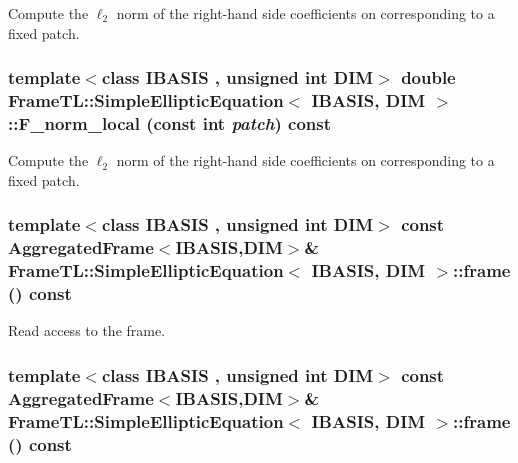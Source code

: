 Compute the $\ell_2$ norm of the right-hand side coefficients on corresponding to a fixed patch. \hypertarget{classFrameTL_1_1SimpleEllipticEquation_dc2e6668d1d7f143d1ce1a88e18eddc8}{
\subsubsection[{F\_\-norm\_\-local}]{\setlength{\rightskip}{0pt plus 5cm}template$<$class IBASIS , unsigned int DIM$>$ double {\bf FrameTL::SimpleEllipticEquation}$<$ IBASIS, DIM $>$::F\_\-norm\_\-local (const int {\em patch}) const}}
\label{classFrameTL_1_1SimpleEllipticEquation_dc2e6668d1d7f143d1ce1a88e18eddc8}


Compute the $\ell_2$ norm of the right-hand side coefficients on corresponding to a fixed patch. \hypertarget{classFrameTL_1_1SimpleEllipticEquation_21d88cf95981a8f5c3187c7339491b41}{
\subsubsection[{frame}]{\setlength{\rightskip}{0pt plus 5cm}template$<$class IBASIS , unsigned int DIM$>$ const {\bf AggregatedFrame}$<$IBASIS,DIM$>$\& {\bf FrameTL::SimpleEllipticEquation}$<$ IBASIS, DIM $>$::frame () const}}
\label{classFrameTL_1_1SimpleEllipticEquation_21d88cf95981a8f5c3187c7339491b41}


Read access to the frame. \hypertarget{classFrameTL_1_1SimpleEllipticEquation_21d88cf95981a8f5c3187c7339491b41}{
\subsubsection[{frame}]{\setlength{\rightskip}{0pt plus 5cm}template$<$class IBASIS , unsigned int DIM$>$ const {\bf AggregatedFrame}$<$IBASIS,DIM$>$\& {\bf FrameTL::SimpleEllipticEquation}$<$ IBASIS, DIM $>$::frame () const}}
\label{classFrameTL_1_1SimpleEllipticEquation_21d88cf95981a8f5c3187c7339491b41}


